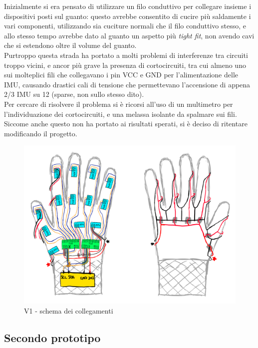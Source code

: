 Inizialmente si era pensato di utilizzare un filo conduttivo per collegare insieme i dispositivi posti sul guanto: questo avrebbe consentito di cucire più saldamente i vari componenti, utilizzando sia cuciture normali che il filo conduttivo stesso, e allo stesso tempo avrebbe dato al guanto un aspetto più \textit{tight fit}, non avendo cavi che si estendono oltre il volume del guanto.\\
Purtroppo questa strada ha portato a molti problemi di interferenze tra circuiti troppo vicini, e ancor più grave la presenza di cortocircuiti, tra cui almeno uno sui molteplici fili che collegavano i pin VCC e GND per l'alimentazione delle IMU, causando drastici cali di tensione che permettevano l'accensione di appena 2/3 IMU su 12 (sparse, non sullo stesso dito).\\

Per cercare di risolvere il problema si è ricorsi all'uso di un multimetro per l'individuazione dei cortocircuiti, e una melassa isolante da spalmare sui fili. Siccome anche questo non ha portato ai risultati sperati, si è deciso di ritentare modificando il progetto.

\begin{figure}[H]
    \includegraphics[scale=0.35]{immagini/guanto_schema.png}
    \centering
    \caption{V1 - schema dei collegamenti}
\end{figure}

\clearpage

\subsection{Secondo prototipo}

